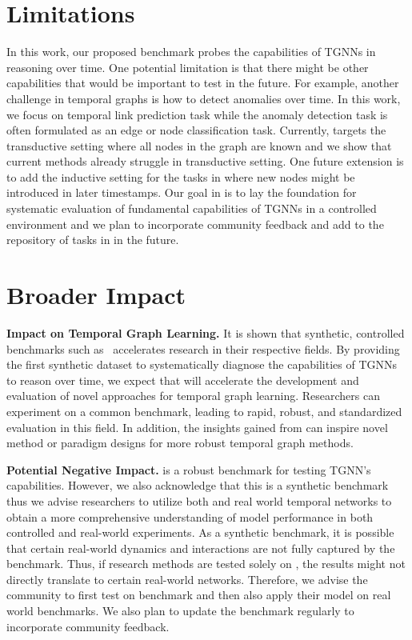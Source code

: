 \section{Limitations} \label{appendix:limit}

In this work, our proposed \benchmarkname benchmark probes the capabilities of TGNNs in reasoning over time. One potential limitation is that there might be other capabilities that would be important to test in the future. For example, another challenge in temporal graphs is how to detect anomalies over time. In this work, we focus on temporal link prediction task while the anomaly detection task is often formulated as an edge or node classification task. Currently, \benchmarkname targets the transductive setting where all nodes in the graph are known and we show that current methods already struggle in transductive setting. One future extension is to add the inductive setting for the tasks in \benchmarkname where new nodes might be introduced in later timestamps. Our goal in \benchmarkname is to lay the foundation for systematic evaluation of fundamental capabilities of TGNNs in a controlled environment and we plan to incorporate community feedback and add to the repository of tasks in \benchmarkname in the future.



\section{Broader Impact} \label{appendix:impact}

\textbf{Impact on Temporal Graph Learning.}
It is shown that synthetic, controlled benchmarks such as~\citep{clevr,babi,bsuite} accelerates research in their respective fields. By providing the first synthetic dataset to systematically diagnose the capabilities of TGNNs to reason over time, we expect that \benchmarkname will accelerate the development and evaluation of novel approaches for temporal graph learning. Researchers can experiment on a common benchmark, leading to rapid, robust, and standardized evaluation in this field. In addition, the insights gained from \benchmarkname can inspire novel method or paradigm designs for more robust temporal graph methods. 

\textbf{Potential Negative Impact.} 
\benchmarkname is a robust benchmark for testing TGNN's capabilities. However, we also acknowledge that this is a synthetic benchmark thus we advise researchers to utilize both \benchmarkname and real world temporal networks to obtain a more comprehensive understanding of model performance in both controlled and real-world experiments. As a synthetic benchmark, it is possible that certain real-world dynamics and interactions are not fully captured by the benchmark. Thus, if research methods are tested solely on \benchmarkname, the results might not directly translate to certain real-world networks. Therefore, we advise the community to first test on \benchmarkname benchmark and then also apply their model on real world benchmarks. We also plan to update the benchmark regularly to incorporate community feedback. 


